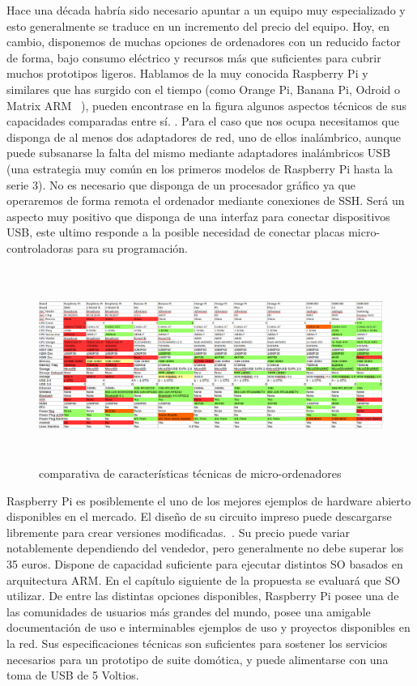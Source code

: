 \vspace{1.5cm}

Hace una década habría sido necesario apuntar a un equipo muy especializado y esto generalmente se traduce en un incremento del precio del equipo. Hoy, en cambio, disponemos de muchas opciones de ordenadores con un reducido factor de forma, bajo consumo eléctrico y recursos más que suficientes para cubrir muchos prototipos ligeros. Hablamos de la muy conocida Raspberry Pi y similares que has surgido con el tiempo (como Orange Pi, Banana Pi, Odroid o Matrix ARM ~\cite{lignuxComparative}), pueden encontrase en la figura  algunos aspectos técnicos de sus capacidades comparadas entre sí.
. Para el caso que nos ocupa necesitamos que disponga de al menos dos adaptadores de red, uno de ellos inalámbrico, aunque puede subsanarse la falta del mismo mediante adaptadores inalámbricos USB (una estrategia muy común en los primeros modelos de Raspberry Pi hasta la serie 3). No es necesario que disponga de un procesador gráfico ya que operaremos de forma remota el ordenador mediante conexiones de SSH. Será un aspecto muy positivo que disponga de una interfaz para conectar dispositivos USB, este ultimo responde a la posible necesidad de conectar placas micro-controladoras para su programación.

\begin{figure}[hbt!]
\centering
\includegraphics[height=2.5in]{figures/comparativaOrdenadores.png}
\caption[Comparativas de micro-ordenadores]{comparativa de características técnicas de micro-ordenadores\footnotemark}
\end{figure}


Raspberry Pi es posiblemente el uno de los mejores ejemplos de hardware abierto disponibles en el mercado. El diseño de su circuito impreso puede descargarse libremente para crear versiones modificadas.~\cite{raspberry_schematics}. Su precio puede variar notablemente dependiendo del vendedor, pero generalmente no debe superar los 35 euros. Dispone de capacidad suficiente para ejecutar distintos SO basados en arquitectura ARM. En el capítulo siguiente de la propuesta se evaluará que SO utilizar. De entre las distintas opciones disponibles, Raspberry Pi posee una de las comunidades de usuarios más grandes del mundo, posee una amigable documentación de uso e interminables ejemplos de uso y proyectos disponibles en la red. Sus especificaciones técnicas son suficientes para sostener los servicios necesarios para un prototipo de suite domótica, y puede alimentarse con una toma de USB de 5 Voltios.

